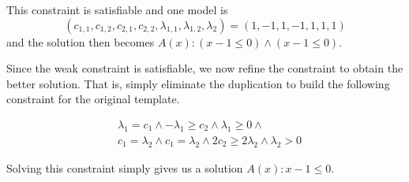 This constraint is satisfiable and one model is
\[ ( c_{1,1}, c_{1,2}, c_{2,1}, c_{2,2}, \lambda_{1,1}, \lambda_{1,2}, \lambda_2 ) =
( 1, -1, 1, -1, 1, 1, 1 ) \] and the solution then becomes
$A(x) : (x -1 \leq 0) \wedge (x -1 \leq 0)$.

Since the weak constraint is satisfiable, we now refine the constraint
to obtain the better solution.  That is, simply eliminate the
duplication to build the following constraint for the original
template.

\begin{align*}
& \lambda_1 = c_1 \wedge - \lambda_1 \geq c_2 \wedge \lambda_1 \geq 0 \wedge \\
& c_1 = \lambda_2 \wedge c_1 = \lambda_2 \wedge 2 c_2 \geq 2 \lambda_2 \wedge \lambda_2 > 0
\end{align*}

Solving this constraint simply gives us a solution
$A(x) : x -1 \leq 0$.

